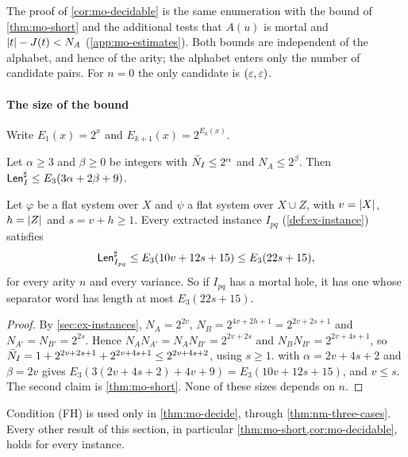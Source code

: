The proof of \cref{cor:mo-decidable} is the same enumeration with the bound of
\cref{thm:mo-short} and the additional tests that $A(u)$ is mortal and
$\lvert t\rvert-J(t)<N_A$ (\cref{app:mo-estimates}). Both bounds are independent of the
alphabet, and hence of the arity; the alphabet enters only the number of
candidate pairs. For $n=0$ the only candidate is $(\varepsilon,\varepsilon)$.

\paragraph{The size of the bound}
Write $E_1(x)=2^x$ and $E_{k+1}(x)=2^{E_k(x)}$.

\begin{lemma}\label{lem:mo-estimate}
Let $\alpha\ge3$ and $\beta\ge0$ be integers with $\bar N_I\le2^\alpha$ and
$N_A\le2^\beta$. Then $\mathsf{Len}^{\sharp}_I\le E_3(3\alpha+2\beta+9)$.
\end{lemma}

\begin{corollary}\label{cor:mo-extracted}
Let $\varphi$ be a flat system over $X$ and $\psi$ a flat system over $X\cup Z$,
with $v=\lvert X\rvert$, $h=\lvert Z\rvert$ and $s=v+h\ge1$. Every extracted instance $I_{pq}$
(\cref{def:ex-instance}) satisfies
\[
 \mathsf{Len}^{\sharp}_{I_{pq}}\le E_3(10v+12s+15)\le E_3(22s+15),
\]
for every arity $n$ and every variance. So if $I_{pq}$ has a mortal hole, it
has one whose separator word has length at most $E_3(22s+15)$.
\end{corollary}

\begin{proof}
By \cref{sec:ex-instances}, $N_A=2^{2v}$, $N_B=2^{4v+2h+1}=2^{2v+2s+1}$ and
$N_{A'}=N_{B'}=2^{2s}$. Hence $N_AN_{A'}=N_AN_{B'}=2^{2v+2s}$ and
$N_BN_{B'}=2^{2v+4s+1}$, so $\bar N_I=1+2^{2v+2s+1}+2^{2v+4s+1}\le2^{2v+4s+2}$,
using $s\ge1$.  with $\alpha=2v+4s+2$ and $\beta=2v$
gives $E_3(3(2v+4s+2)+4v+9)=E_3(10v+12s+15)$, and $v\le s$. The second claim
is \cref{thm:mo-short}. None of these sizes depends on $n$.
\end{proof}

\begin{remark}\label{rem:mo-fh}
Condition (FH) is used only in \cref{thm:mo-decide}, through
\cref{thm:nm-three-cases}. Every other result of this section, in particular
\cref{thm:mo-short,cor:mo-decidable}, holds for every instance.
\end{remark}
